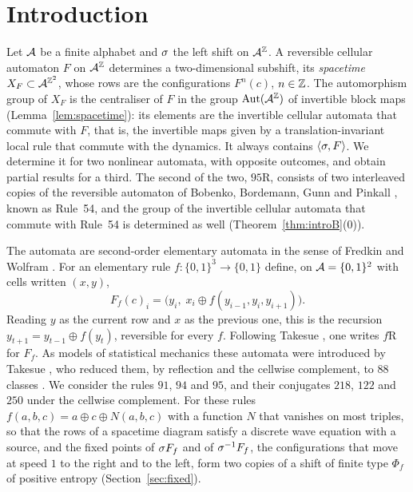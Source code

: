 \section{Introduction}\label{sec:intro}

Let $\mathcal{A}$ be a finite alphabet and $\sigma$ the left shift on $\mathcal{A}^{\mathbb{Z}}$. A reversible cellular automaton $F$ on $\mathcal{A}^{\mathbb{Z}}$ determines a two-dimensional subshift, its \emph{spacetime} $X_F\subset\mathcal{A}^{\mathbb{Z}^2}$, whose rows are the configurations $F^n(c)$, $n\in\mathbb{Z}$. The automorphism group of $X_F$ is the centraliser of $F$ in the group $\operatorname{Aut}(\mathcal{A}^{\mathbb{Z}})$ of invertible block maps (Lemma~\ref{lem:spacetime}): its elements are the invertible cellular automata that commute with $F$, that is, the invertible maps given by a translation-invariant local rule that commute with the dynamics. It always contains $\langle\sigma,F\rangle$. We determine it for two nonlinear automata, with opposite outcomes, and obtain partial results for a third. The second of the two, $95$R, consists of two interleaved copies of the reversible automaton of Bobenko, Bordemann, Gunn and Pinkall \cite{BBGP1993}, known as Rule~54, and the group of the invertible cellular automata that commute with Rule~54 is determined as well (Theorem~\ref{thm:introB}(0)).

The automata are second-order elementary automata in the sense of Fredkin and Wolfram \cite{TM1990,Wolfram2002}. For an elementary rule $f\colon\{0,1\}^3\to\{0,1\}$ define, on $\mathcal{A}=\{0,1\}^2$ with cells written $(x,y)$,
\begin{equation}\label{eq:F}
F_f(c)_i=\bigl(y_i,\;x_i\oplus f(y_{i-1},y_i,y_{i+1})\bigr).
\end{equation}
Reading $y$ as the current row and $x$ as the previous one, this is the recursion $y_{t+1}=y_{t-1}\oplus f(y_t)$, reversible for every $f$. Following Takesue \cite{Takesue1987}, one writes $f$R for $F_f$. As models of statistical mechanics these automata were introduced by Takesue \cite{Takesue1987,Takesue1989}, who reduced them, by reflection and the cellwise complement, to $88$ classes \cite[Table~I]{Takesue1989}. We consider the rules $91$, $94$ and $95$, and their conjugates $218$, $122$ and $250$ under the cellwise complement. For these rules $f(a,b,c)=a\oplus c\oplus N(a,b,c)$ with a function $N$ that vanishes on most triples, so that the rows of a spacetime diagram satisfy a discrete wave equation with a source, and the fixed points of $\sigma F_f$ and of $\sigma^{-1}F_f$, the configurations that move at speed $1$ to the right and to the left, form two copies of a shift of finite type $\Phi_f$ of positive entropy (Section~\ref{sec:fixed}).


